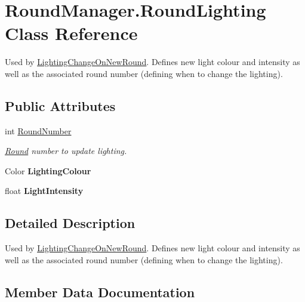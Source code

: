 \hypertarget{class_round_manager_1_1_round_lighting}{}\section{Round\+Manager.\+Round\+Lighting Class Reference}
\label{class_round_manager_1_1_round_lighting}


Used by \hyperlink{class_round_manager_1_1_lighting_change_on_new_round}{Lighting\+Change\+On\+New\+Round}. Defines new light colour and intensity as well as the associated round number (defining when to change the lighting).  


\subsection*{Public Attributes}
\begin{DoxyCompactItemize}
\item 
int \hyperlink{class_round_manager_1_1_round_lighting_abfc7abd8d147288729e66041060f6cb6}{Round\+Number}
\begin{DoxyCompactList}\small\item\em \hyperlink{class_round_manager_1_1_round}{Round} number to update lighting. \end{DoxyCompactList}\item 
\hypertarget{class_round_manager_1_1_round_lighting_afa86c17986cd7aeb47d38888408b0557}{}Color {\bfseries Lighting\+Colour}\label{class_round_manager_1_1_round_lighting_afa86c17986cd7aeb47d38888408b0557}

\item 
\hypertarget{class_round_manager_1_1_round_lighting_a4be33f3d58ec6d595669b9c0969b83cb}{}float {\bfseries Light\+Intensity}\label{class_round_manager_1_1_round_lighting_a4be33f3d58ec6d595669b9c0969b83cb}

\end{DoxyCompactItemize}


\subsection{Detailed Description}
Used by \hyperlink{class_round_manager_1_1_lighting_change_on_new_round}{Lighting\+Change\+On\+New\+Round}. Defines new light colour and intensity as well as the associated round number (defining when to change the lighting). 



\subsection{Member Data Documentation}
\hypertarget{class_round_manager_1_1_round_lighting_abfc7abd8d147288729e66041060f6cb6}{}
